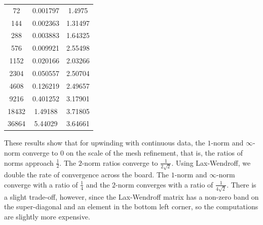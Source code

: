 \documentclass{article} %
\theoremstyle{plain}
\numberwithin{equation}{section} %
\numberwithin{figure}{section} %
\numberwithin{table}{section} %
\begin{document}
\begin{enumerate}[\ \ (a)]
\begin{table}[ht!]
\begin{tabular}{||c|c|c||}
                72 &            0.001797 &         1.4975   \\
               144 &            0.002363 &         1.31497  \\
               288 &            0.003883 &         1.64325  \\
               576 &            0.009921 &         2.55498  \\
              1152 &            0.020166 &         2.03266  \\
              2304 &            0.050557 &         2.50704  \\
              4608 &            0.126219 &         2.49657  \\
              9216 &            0.401252 &         3.17901  \\
             18432 &            1.49188  &         3.71805  \\
             36864 &            5.44029  &         3.64661  \\
            \hline\hline
            \end{tabular}
        \end{table}
        \FloatBarrier
        These results show that for upwinding with continuous data, the $1$-norm and $\infty$-norm converge to $0$ on the scale of the mesh refinement, that is, the ratios of norms approach $\frac{1}{2}$.  The $2$-norm ratios converge to $\frac{1}{2\sqrt{2}}$.  Using Lax-Wendroff, we double the rate of convergence across the board.  The $1$-norm and $\infty$-norm converge with a ratio of $\frac{1}{4}$ and the $2$-norm converges with a ratio of $\frac{1}{4\sqrt{2}}$.  There is a slight trade-off, however, since the Lax-Wendroff matrix has a non-zero band on the super-diagonal and an element in the bottom left corner, so the computations are slightly more expensive.


\end{enumerate}
\end{document}
